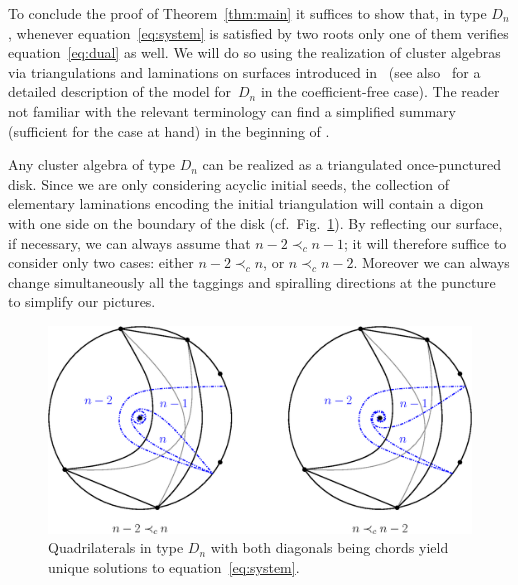\documentclass[pdftex]{sigma}
\numberwithin{equation}{section}
\begin{document}
  To conclude the proof of Theorem~\ref{thm:main} it suf\/f\/ices to show that, in type $D_n$, whenever equation~\eqref{eq:system} is satisf\/ied by two roots only one of them verif\/ies equation~\eqref{eq:dual} as well.
  We will do so using the realization of cluster algebras via triangulations and laminations on surfaces introduced in~\cite{FST08,FT12} (see also~\cite{Sch08} for a detailed description of the model for~$D_n$ in the coef\/f\/icient-free case).
  The reader not familiar with the relevant terminology can f\/ind a simplif\/ied summary (suf\/f\/icient for the case at hand) in the beginning of \cite[Section~4.1]{NS14}.

  Any cluster algebra of type $D_n$ can be realized as a triangulated once-punctured disk.
  Since we are only considering acyclic initial seeds, the collection of elementary laminations encoding the initial triangulation will contain a digon with one side on the boundary of the disk (cf.\ Fig.~\ref{fig:D_n-roots}).
  By ref\/lecting our surface, if necessary, we can always assume that $n-2 \prec_c n-1$; it will therefore suf\/f\/ice to consider only two cases: either $n-2 \prec_c n$, or $n \prec_c n-2$.
  Moreover we can always change simultaneously all the taggings and spiralling directions at the puncture to simplify our pictures.

  \begin{figure}[t]\centering
    \includegraphics[scale=0.6]{D_n-roots.eps}
    \caption{Quadrilaterals in type $D_n$ with both diagonals being chords yield unique solutions to equation~\eqref{eq:system}.}
    \label{fig:D_n-roots}
  \end{figure}
\end{document}
